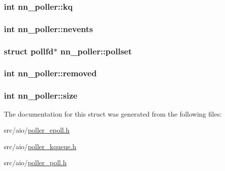\subsubsection[{kq}]{\setlength{\rightskip}{0pt plus 5cm}int nn\+\_\+poller\+::kq}\hypertarget{structnn__poller_a2c791ee1963160c78f0e69f87c520618}{}\label{structnn__poller_a2c791ee1963160c78f0e69f87c520618}
\subsubsection[{nevents}]{\setlength{\rightskip}{0pt plus 5cm}int nn\+\_\+poller\+::nevents}\hypertarget{structnn__poller_afb554c7c16ed86202143b7b9edb0e810}{}\label{structnn__poller_afb554c7c16ed86202143b7b9edb0e810}
\subsubsection[{pollset}]{\setlength{\rightskip}{0pt plus 5cm}struct pollfd$\ast$ nn\+\_\+poller\+::pollset}\hypertarget{structnn__poller_ab8868a38e93b921fdc9822e4ee4bae38}{}\label{structnn__poller_ab8868a38e93b921fdc9822e4ee4bae38}
\subsubsection[{removed}]{\setlength{\rightskip}{0pt plus 5cm}int nn\+\_\+poller\+::removed}\hypertarget{structnn__poller_a6db22cb59d715d1afdf008cf58c3d419}{}\label{structnn__poller_a6db22cb59d715d1afdf008cf58c3d419}
\subsubsection[{size}]{\setlength{\rightskip}{0pt plus 5cm}int nn\+\_\+poller\+::size}\hypertarget{structnn__poller_ab898f454acc5a9cb9a6133e2273e753a}{}\label{structnn__poller_ab898f454acc5a9cb9a6133e2273e753a}


The documentation for this struct was generated from the following files\+:\begin{DoxyCompactItemize}
\item 
src/aio/\hyperlink{poller__epoll_8h}{poller\+\_\+epoll.\+h}\item 
src/aio/\hyperlink{poller__kqueue_8h}{poller\+\_\+kqueue.\+h}\item 
src/aio/\hyperlink{poller__poll_8h}{poller\+\_\+poll.\+h}\end{DoxyCompactItemize}
